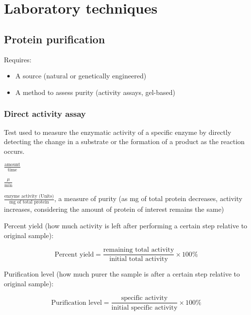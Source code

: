 \documentclass[letterpaper, 12pt]{article}
\begin{document}
\newpage

\section*{Laboratory techniques}

\subsection*{Protein purification}
Requires:

\begin{itemize}
\item A source (natural or genetically engineered)
\item A method to assess purity (activity assays, gel-based)
\end{itemize}

\subsubsection*{Direct activity assay}

Test used to measure the enzymatic activity of a specific enzyme by directly detecting the change in a substrate or the formation of a product as the reaction occurs.

\begin{description}
\item [activity] $\displaystyle \frac{\text{amount}}{\text{time}}$
\item [standard enzyme activity, U] $\displaystyle \frac{\mu}{\text{min}}$
\item [specific activity] $\displaystyle \frac{\text{enzyme activity (Units)}}{\text{mg of total protein}}$, a measure of purity (as mg of total protein decreases, activity increases, considering the amount of protein of interest remains the same)

\item {Percent yield} (how much activity is left after performing a certain step relative to original sample):

\begin{equation}
\text{Percent yield} = \frac{\text{remaining total activity}}{\text{initial total activity}} \times 100\%
\end{equation}

\item {Purification level} (how much purer the sample is after a certain step relative to original sample):

\begin{equation}
\text{Purification level} = \frac{\text{specific activity}}{\text{initial specific activity}} \times 100\%
\end{equation}

\end{description}
\end{document}
